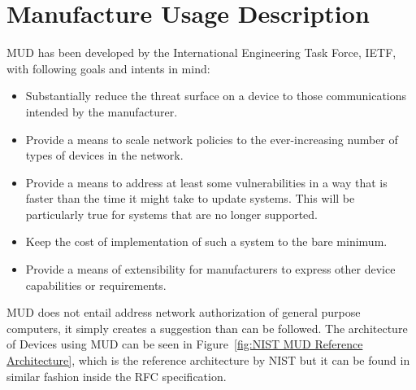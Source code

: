 


\section{Manufacture Usage Description} %
\label{sec:Manufacture Usage Description}

MUD has been developed by the International Engineering Task Force, IETF, with following goals and intents in mind:
\cite{rfc8520-mud}
\begin{itemize}
	\item Substantially reduce the threat surface on a device to those communications intended by the manufacturer.
	\item Provide a means to scale network policies to the ever-increasing number of types of devices in the network.
	\item Provide a means to address at least some vulnerabilities in a way that is faster than the time it might
	      take to update systems. This will be particularly true for systems that are no longer supported.
	\item Keep the cost of implementation of such a system to the bare minimum.
	\item Provide a means of extensibility for manufacturers to express other device capabilities or requirements.
\end{itemize}

MUD does not entail address network authorization of general purpose computers, it simply creates a suggestion than can
be followed.
The architecture of Devices using MUD can be seen in Figure~\ref{fig:NIST MUD Reference Architecture}, which is the
reference architecture by NIST \cite{dodson2021securing} but it can be found in similar fashion inside the RFC
specification.

